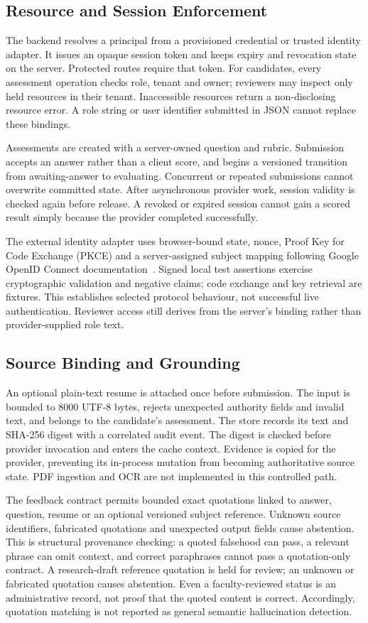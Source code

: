 \documentclass[conference]{IEEEtran}
\begin{document}
\subsection{Resource and Session Enforcement}
The backend resolves a principal from a provisioned credential or trusted identity adapter. It issues an opaque session token and keeps expiry and revocation state on the server. Protected routes require that token. For candidates, every assessment operation checks role, tenant and owner; reviewers may inspect only held resources in their tenant. Inaccessible resources return a non-disclosing resource error. A role string or user identifier submitted in JSON cannot replace these bindings.

Assessments are created with a server-owned question and rubric. Submission accepts an answer rather than a client score, and begins a versioned transition from awaiting-answer to evaluating. Concurrent or repeated submissions cannot overwrite committed state. After asynchronous provider work, session validity is checked again before release. A revoked or expired session cannot gain a scored result simply because the provider completed successfully.

The external identity adapter uses browser-bound state, nonce, Proof Key for Code Exchange (PKCE) and a server-assigned subject mapping following Google OpenID Connect documentation~\cite{google_oidc}. Signed local test assertions exercise cryptographic validation and negative claims; code exchange and key retrieval are fixtures. This establishes selected protocol behaviour, not successful live authentication. Reviewer access still derives from the server's binding rather than provider-supplied role text.

\subsection{Source Binding and Grounding}
An optional plain-text resume is attached once before submission. The input is bounded to 8000 UTF-8 bytes, rejects unexpected authority fields and invalid text, and belongs to the candidate's assessment. The store records its text and SHA-256 digest with a correlated audit event. The digest is checked before provider invocation and enters the cache context. Evidence is copied for the provider, preventing its in-process mutation from becoming authoritative source state. PDF ingestion and OCR are not implemented in this controlled path.

The feedback contract permits bounded exact quotations linked to answer, question, resume or an optional versioned subject reference. Unknown source identifiers, fabricated quotations and unexpected output fields cause abstention. This is structural provenance checking: a quoted falsehood can pass, a relevant phrase can omit context, and correct paraphrases cannot pass a quotation-only contract. A research-draft reference quotation is held for review; an unknown or fabricated quotation causes abstention. Even a faculty-reviewed status is an administrative record, not proof that the quoted content is correct. Accordingly, quotation matching is not reported as general semantic hallucination detection.
\end{document}
